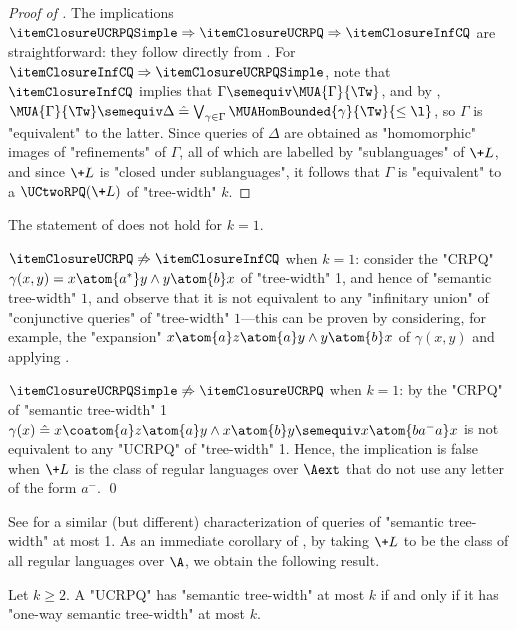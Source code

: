 \begin{proof}[Proof of ]
    The implications
	$\itemClosureUCRPQSimple \Rightarrow \itemClosureUCRPQ \Rightarrow \itemClosureInfCQ$
	are straightforward:
    they follow directly from .
    For $\itemClosureInfCQ \Rightarrow \itemClosureUCRPQSimple$, note that $\itemClosureInfCQ$ implies that
    $\Gamma \semequiv \MUA{\Gamma}{\Tw}$, and by
    ,
    $\MUA{\Gamma}{\Tw} \semequiv \Delta \defeq
    \bigvee_{\gamma \in \Gamma} \MUAHomBounded{\gamma}{\Tw}{\leq \l}$,
    so $\Gamma$ is "equivalent" to the latter.
    Since queries of $\Delta$ are obtained as "homomorphic" images
    of "refinements" of $\Gamma$, all of which are labelled by "sublanguages" of
    $\+L$, and since $\+L$ is "closed under sublanguages", it follows that
    $\Gamma$ is "equivalent" to a $\UCtwoRPQ(\+L)$ of "tree-width" $k$.
\end{proof}

\begin{remark}
    \AP\label{rk:closure-under-sublanguages-k1}
	The statement of  does not hold for $k=1$.

    $\itemClosureUCRPQ \not\Rightarrow \itemClosureInfCQ$ when $k=1$:
    consider the "CRPQ" $\gamma(x,y) = x \atom{a^*} y \land y \atom{b} x$ of "tree-width" 1,
    and hence of "semantic tree-width" $1$, and observe that it is not equivalent to any
    "infinitary union" of "conjunctive queries" of "tree-width" $1$---this can be proven
    by considering, for example, the "expansion"
    $x \atom{a} z \atom{a} y \land y \atom{b} x$ of $\gamma(x,y)$
    and applying .

    $\itemClosureUCRPQSimple \not\Rightarrow \itemClosureUCRPQ$ when $k=1$:
	by \cite[Proposition 6.4]{BarceloRV16} the "CRPQ"
    of "semantic tree-width" 1
    $\gamma(x) \defeq x \coatom{a} z \atom{a} y \land x \atom{b} y \semequiv x \atom{ba^- a} x$
    is not equivalent to any "UCRPQ" of "tree-width" 1. Hence, the implication is false when $\+L$ is the class of regular languages over $\Aext$
    that do not use any letter of the form $a^-$. \qed
\end{remark}

See  for a similar (but different) characterization
of queries of "semantic tree-width" at most 1.
As an immediate corollary of , by taking
$\+L$ to be the class of all regular languages over $\A$, we obtain the following result.
\begin{corollary}
	\AP\label{coro:collapse-twoway-oneway-semtw}
	Let $k \geq 2$. A "UCRPQ" has "semantic tree-width" at most $k$
	if and only if it has "one-way semantic tree-width" at most $k$.
\end{corollary}

